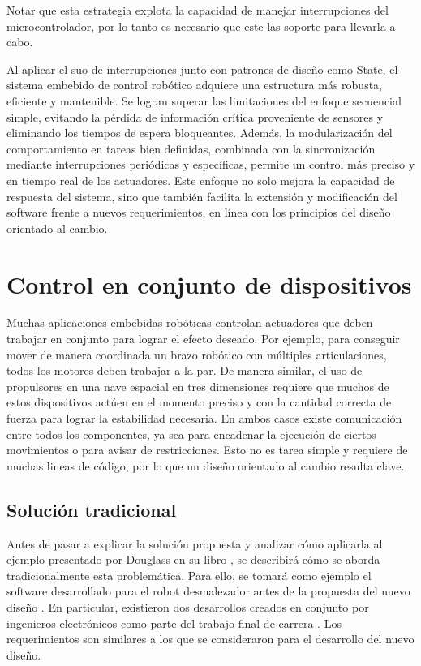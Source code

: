 Notar que esta estrategia explota la capacidad de manejar interrupciones del microcontrolador, por lo tanto es necesario que este las soporte para llevarla a cabo.

Al aplicar el suo de interrupciones junto con patrones de diseño como State, el sistema embebido de control robótico adquiere una estructura más robusta, eficiente y mantenible. Se logran superar las limitaciones del enfoque secuencial simple, evitando la pérdida de información crítica proveniente de sensores y eliminando los tiempos de espera bloqueantes. Además, la modularización del comportamiento en tareas bien definidas, combinada con la sincronización mediante interrupciones periódicas y específicas, permite un control más preciso y en tiempo real de los actuadores. Este enfoque no solo mejora la capacidad de respuesta del sistema, sino que también facilita la extensión y modificación del software frente a nuevos requerimientos, en línea con los principios del diseño orientado al cambio.






\section{Control en conjunto de dispositivos}
Muchas aplicaciones embebidas robóticas controlan \gls{actuadores} que deben trabajar en conjunto para lograr el efecto deseado. Por ejemplo, para conseguir mover de manera coordinada un brazo robótico con múltiples articulaciones, todos los motores deben trabajar a la par. De manera similar, el uso de propulsores en una nave espacial en tres dimensiones requiere que muchos de estos dispositivos actúen en el momento preciso y con la cantidad correcta de fuerza para lograr la estabilidad necesaria. En ambos casos existe comunicación entre todos los componentes, ya sea para encadenar la ejecución de ciertos movimientos o para avisar de restricciones. Esto no es tarea simple y requiere de muchas lineas de código, por lo que un diseño orientado al cambio resulta clave.

\subsection*{Solución tradicional}

Antes de pasar a explicar la solución propuesta y analizar cómo aplicarla al ejemplo presentado por Douglass en su libro \cite{douglass}, se describirá cómo se aborda tradicionalmente esta problemática. Para ello, se tomará como ejemplo el software desarrollado para el robot desmalezador antes de la propuesta del nuevo diseño \cite{paperPomponio}. En particular, existieron dos desarrollos creados en conjunto por ingenieros electrónicos como parte del trabajo final de carrera \cite{disenioViejo1, disenioViejo2}. Los requerimientos son similares a los que se consideraron para el desarrollo del nuevo diseño.

